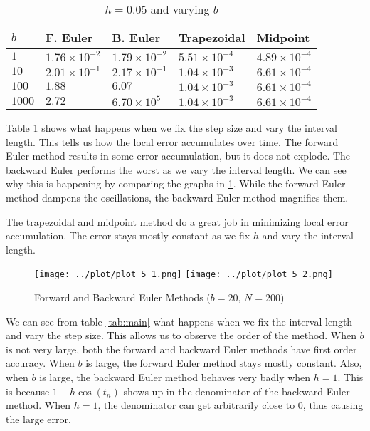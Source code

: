\begin{solution}
  \begin{table}[!ht]
    \label{tab:vary_b}
    \centering
    \caption{$h = 0.05$ and varying $b$}
    \begin{tabular}{|lllll|}
      \hline
      $b$    & F. Euler    & B. Euler       & Trapezoidal & Midpoint \\
      \hline   
      $1$    & $1.76 \times 10^{-2}$ & $1.79 \times 10^{-2}$   & $5.51 \times 10^{-4}$ & $4.89 \times 10^{-4}$ \\
      $10$   & $2.01 \times 10^{-1}$ & $2.17 \times 10^{-1}$   & $1.04 \times 10^{-3}$ & $6.61 \times 10^{-4}$ \\
      $100$  & $1.88$                & $6.07$                  & $1.04 \times 10^{-3}$ & $6.61 \times 10^{-4}$ \\
      $1000$ & $2.72$                & $6.70 \times 10^{5}$    & $1.04 \times 10^{-3}$ & $6.61 \times 10^{-4}$ \\
      \hline
    \end{tabular}
  \end{table}
  
  Table \ref{tab:vary_b} shows what happens when we fix the step size and vary the interval length. This tells us how the local error accumulates over time. The forward Euler method results in some error accumulation, but it does not explode. The backward Euler performs the worst as we vary the interval length. We can see why this is happening by comparing the graphs in \ref{fig:fb}. While the forward Euler method dampens the oscillations, the backward Euler method magnifies them.
  
  The trapezoidal and midpoint method do a great job in minimizing local error accumulation. The error stays mostly constant as we fix $h$ and vary the interval length.
  
  \begin{figure}[!ht]
    \centering
    \texttt{[image: ../plot/plot\_5\_1.png]}
    \texttt{[image: ../plot/plot\_5\_2.png]}
    \caption{Forward and Backward Euler Methods ($b=20$, $N=200$)}
    \label{fig:fb}
  \end{figure}
  
  We can see from table \ref{tab:main} what happens when we fix the interval length and vary the step size. This allows us to observe the order of the method. When $b$ is not very large, both the forward and backward Euler methods have first order accuracy. When $b$ is large, the forward Euler method stays mostly constant. Also, when $b$ is large, the backward Euler method behaves very badly when $h = 1$. This is because $1 - h \cos(t_n)$ shows up in the denominator of the backward Euler method. When $h = 1$, the denominator can get arbitrarily close to $0$, thus causing the large error.
  

\end{solution}
